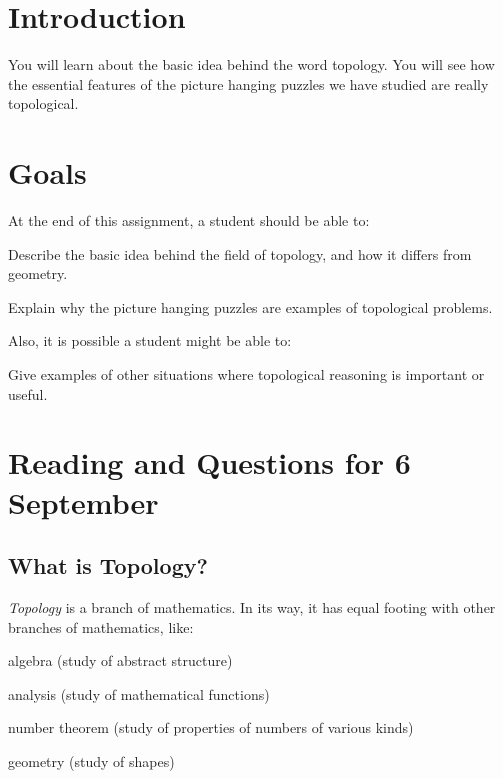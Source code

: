 \documentclass[12pt,letterpaper]{article}
\theoremstyle{definition}
\begin{document}
\setlength{\parskip}{1ex plus 0.5ex minus 0.2ex}
\setlength{\parindent}{0pt}

\pagestyle{fancy}
\cfoot{}

\section*{Introduction}
You will learn about the basic idea behind the word topology.
You will see how the essential features of the picture hanging puzzles we have studied are really topological.

\section*{Goals}
At the end of this assignment, a student should be able to:
\begin{compactitem}
\item Describe the basic idea behind the field of topology, and how it differs from geometry.
\item Explain why the picture hanging puzzles are examples of topological problems.
\end{compactitem}
Also, it is possible a student might be able to:
\begin{compactitem}
\item Give examples of other situations where topological reasoning is important or useful.
\end{compactitem}

\section*{Reading and Questions for 6 September}

\subsection*{What is Topology?}


\emph{Topology} is a branch of mathematics. In its way, it has equal footing with other branches of mathematics, like:
\begin{compactitem}
\item algebra (study of abstract structure)
\item analysis (study of mathematical functions)
\item number theorem (study of properties of numbers of various kinds)
\item geometry (study of shapes)
\end{compactitem}
\end{document}
